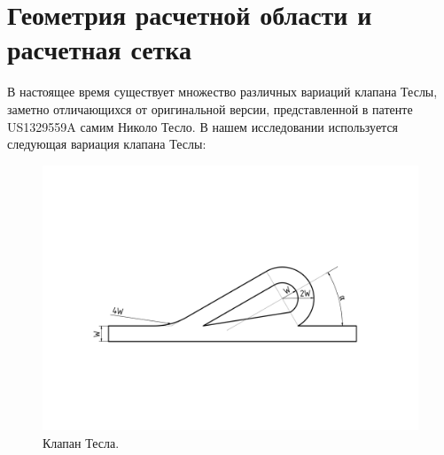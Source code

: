\documentclass[14pt,a4paper]{article}
\begin{document}
        
    
    \section*{Геометрия расчетной области и расчетная сетка}

        В настоящее время существует множество различных вариаций клапана Теслы, заметно отличающихся от оригинальной версии, представленной в патенте US1329559A самим Николо Тесло. В нашем исследовании используется следующая вариация клапана Теслы:


        
         \begin{figure}[H]
             \centering
             \includegraphics[width = 1\linewidth]{teslaDesign}
             \caption{Клапан Тесла.}
             \label{fig:td}
         \end{figure}
        
\end{document}
